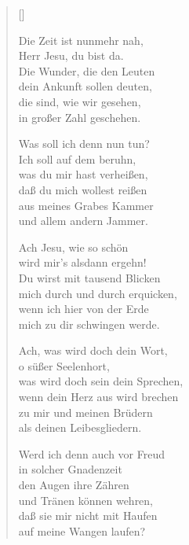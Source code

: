 \begin{multicols}{2}
\settowidth{\versewidth}{Werd ich denn auch vor Freud}
\begin{verse}[\versewidth]

%
 Die Zeit ist nunmehr nah,\\
Herr Jesu, du bist da.\\
Die Wunder, die den Leuten\\
dein Ankunft sollen deuten,\\
die sind, wie wir gesehen,\\
in großer Zahl geschehen.

 Was soll ich denn nun tun?\\
Ich soll auf dem beruhn,\\
was du mir hast verheißen,\\
daß du mich wollest reißen\\
aus meines Grabes Kammer\\
und allem andern Jammer.

 Ach Jesu, wie so schön\\
wird mir's alsdann ergehn!\\
Du wirst mit tausend Blicken\\
mich durch und durch erquicken,\\
wenn ich hier von der Erde\\
mich zu dir schwingen werde.

 Ach, was wird doch dein Wort,\\
o süßer Seelenhort,\\
was wird doch sein dein Sprechen,\\
wenn dein Herz aus wird brechen\\
zu mir und meinen Brüdern\\
als deinen Leibesgliedern.

 Werd ich denn auch vor Freud\\
in solcher Gnadenzeit\\
den Augen ihre Zähren\\
und Tränen können wehren,\\
daß sie mir nicht mit Haufen\\
auf meine Wangen laufen?


\end{verse}
\end{multicols}
